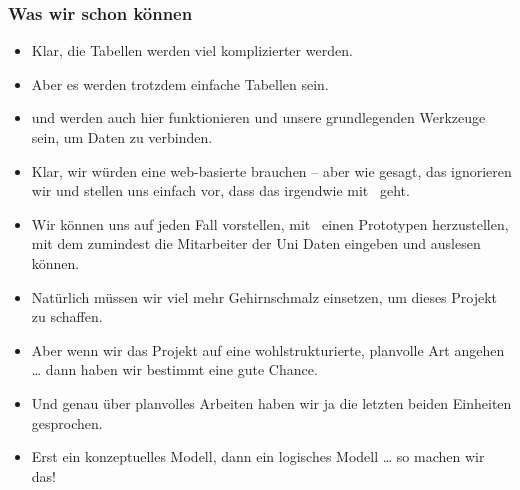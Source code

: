 \documentclass[aspectratio=169,mathserif,notheorems]{beamer}%
\begin{document}
\begin{frame}[t]%
\frametitle{Was wir schon können}%
\begin{itemize}%
%
%
%
%
\item<4-> Klar, die Tabellen werden viel komplizierter werden.%
%
\item<5-> Aber es werden trotzdem einfache Tabellen sein.%
%
\item<6->  und  werden auch hier funktionieren und unsere grundlegenden Werkzeuge sein, um Daten zu verbinden.%
%
\item<7-> Klar, wir würden eine web-basierte  brauchen -- aber wie gesagt, das ignorieren wir und stellen uns einfach vor, dass das irgendwie mit \python\ geht.%
%
\item<8-> Wir können uns auf jeden Fall vorstellen, mit \libreofficeBase\ einen Prototypen herzustellen, mit dem zumindest die Mitarbeiter der Uni Daten eingeben und auslesen können.%
%
\item<9-> Natürlich müssen wir viel mehr Gehirnschmalz einsetzen, um dieses Projekt zu schaffen.%
%
\item<10-> Aber wenn wir das Projekt auf eine wohlstrukturierte, planvolle Art angehen {\dots} dann haben wir bestimmt eine gute Chance.%
%
\item<11-> Und genau über planvolles Arbeiten haben wir ja die letzten beiden Einheiten gesprochen.%
%
\item<12-> Erst ein konzeptuelles Modell, dann ein logisches Modell {\dots} so machen wir das!%
\end{itemize}%
\end{frame}%
%
\endPresentation%
\end{document}

